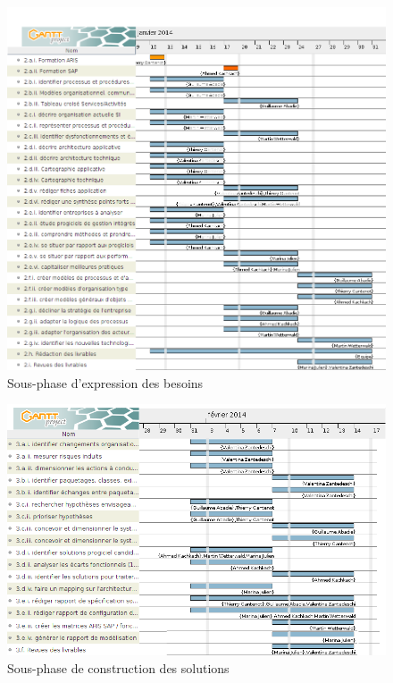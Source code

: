 \begin{figure}[h]
    \centering
    \includegraphics[width=150mm]{./images/SPIE_besoins.png}
    \caption{Sous-phase d'expression des besoins}
    \label{diagram:si_map}
\end{figure}

\begin{figure}[h]
    \centering
    \includegraphics[width=150mm]{./images/SPIE_3.png}
    \caption{Sous-phase de construction des solutions}
    \label{diagram:si_map}
\end{figure}

